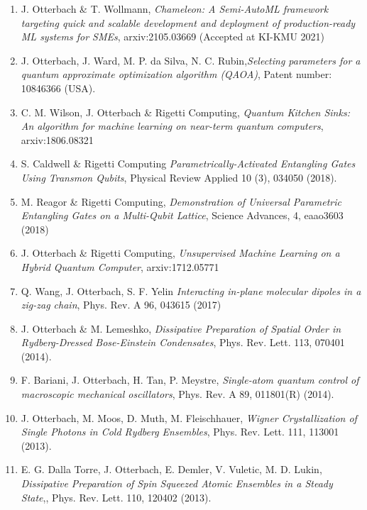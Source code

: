 \documentclass[10pt,centered]{./res} %
\begin{document}
\begin{resume}
\begin{enumerate}
  \item J. Otterbach \& T. Wollmann, \textit{Chameleon: A Semi-AutoML framework targeting quick and scalable development and deployment of production-ready ML systems for SMEs}, arxiv:2105.03669 (Accepted at KI-KMU 2021)
  
  \item J. Otterbach, J. Ward, M. P. da Silva, N. C. Rubin,\textit{Selecting parameters for a quantum approximate optimization algorithm (QAOA)}, Patent number: 10846366 (USA).
  
  \item C. M. Wilson, J. Otterbach \& Rigetti Computing, \textit{Quantum Kitchen Sinks: An algorithm for machine learning on near-term quantum computers}, arxiv:1806.08321
  
  \item S. Caldwell \& Rigetti Computing \textit{Parametrically-Activated Entangling Gates Using Transmon Qubits}, Physical Review Applied 10 (3), 034050 (2018).

  \item M. Reagor \& Rigetti Computing, \textit{Demonstration of Universal Parametric Entangling Gates on a Multi-Qubit Lattice}, Science Advances, 4, eaao3603 (2018)
  
  \item J. Otterbach \& Rigetti Computing, \textit{Unsupervised Machine Learning on a Hybrid Quantum Computer}, arxiv:1712.05771
  
  \item Q. Wang, J. Otterbach, S. F. Yelin \textit{Interacting in-plane molecular dipoles in a zig-zag chain}, Phys. Rev. A 96, 043615 (2017)
  
  \item J. Otterbach \& M. Lemeshko, \textit{Dissipative Preparation of Spatial Order in Rydberg-Dressed Bose-Einstein Condensates}, Phys. Rev. Lett. 113, 070401 (2014).
  
  \item F. Bariani, J. Otterbach, H. Tan, P. Meystre, \textit{Single-atom quantum control of macroscopic mechanical oscillators}, Phys. Rev. A 89, 011801(R) (2014).
  
  \item J. Otterbach, M. Moos, D. Muth, M. Fleischhauer, \textit{Wigner Crystallization of Single Photons in Cold Rydberg Ensembles}, Phys. Rev. Lett. 111, 113001 (2013).
  
  \item E. G. Dalla Torre, J. Otterbach, E. Demler, V. Vuletic, M. D. Lukin, \textit{Dissipative Preparation of Spin Squeezed Atomic Ensembles in a Steady State},, Phys. Rev. Lett. 110, 120402 (2013).
  

\end{enumerate}
\end{resume}
\end{document}
